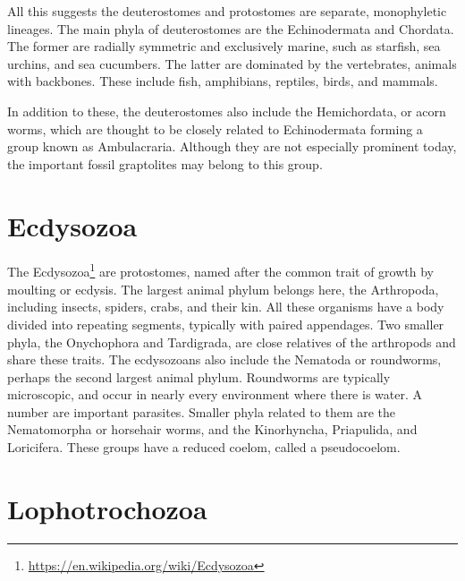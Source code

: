 \documentclass[]{book}
\let\rmarkdownfootnote\footnote%
\def\footnote{\protect\rmarkdownfootnote}
\renewcommand{\href}[2]{#2\footnote{\url{#1}}}
\theoremstyle{definition}
\theoremstyle{definition}
\theoremstyle{definition}
\theoremstyle{remark}
\begin{document}
\begin{enumerate}
All this suggests the deuterostomes and protostomes are separate,
monophyletic lineages. The main phyla of deuterostomes are the
Echinodermata and Chordata. The former are radially symmetric and
exclusively marine, such as starfish, sea urchins, and sea cucumbers.
The latter are dominated by the vertebrates, animals with backbones.
These include fish, amphibians, reptiles, birds, and mammals.

In addition to these, the deuterostomes also include the Hemichordata,
or acorn worms, which are thought to be closely related to Echinodermata
forming a group known as Ambulacraria. Although they are not especially
prominent today, the important fossil graptolites may belong to this
group.

\section{Ecdysozoa}\label{ecdysozoa}

The \href{https://en.wikipedia.org/wiki/Ecdysozoa}{Ecdysozoa} are
protostomes, named after the common trait of growth by moulting or
ecdysis. The largest animal phylum belongs here, the Arthropoda,
including insects, spiders, crabs, and their kin. All these organisms
have a body divided into repeating segments, typically with paired
appendages. Two smaller phyla, the Onychophora and Tardigrada, are close
relatives of the arthropods and share these traits. The ecdysozoans also
include the Nematoda or roundworms, perhaps the second largest animal
phylum. Roundworms are typically microscopic, and occur in nearly every
environment where there is water. A number are important parasites.
Smaller phyla related to them are the Nematomorpha or horsehair worms,
and the Kinorhyncha, Priapulida, and Loricifera. These groups have a
reduced coelom, called a pseudocoelom.

\section{Lophotrochozoa}\label{lophotrochozoa}


\end{enumerate}
\end{document}
